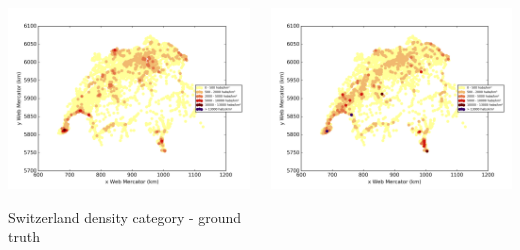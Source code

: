 \documentclass[c]{beamer}
\begin{document}
\begin{frame}
\begin{columns}
 \begin{column}{0.5\textwidth}
  \begin{overlayarea}{\linewidth}{4cm}
    \centering\vfill
    \includegraphics[scale=0.25]{../../data/Suisse/test/Neural_Network_Classification-oversampling/Neural_Network_Classification-oversampling/density_ground_truth.png}
  \end{overlayarea}
  \begin{overlayarea}{\linewidth}{0.5cm}
    \centering
    \tiny Switzerland density category - ground truth\par
  \end{overlayarea}
 \end{column}
 \begin{column}{0.5\textwidth}
  \begin{overlayarea}{\linewidth}{4cm}
    \centering\vfill
    \includegraphics[scale=0.25]{../../data/Suisse/test/Neural_Network_Classification-oversampling/Neural_Network_Classification-oversampling/density_classification.png}

\end{overlayarea}
\end{column}
\end{columns}
\end{frame}
\end{document}
